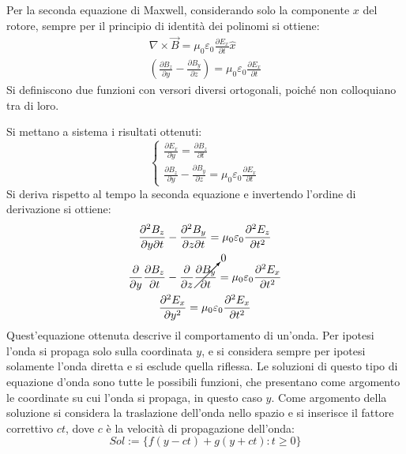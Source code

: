 \documentclass{article}
\numberwithin{equation}{subsection}
\begin{document}
Per la seconda equazione di Maxwell, considerando solo la componente $x$ del rotore, sempre per il principio di identità dei polinomi si ottiene:
\begin{gather*}
    \nabla\times\vec{B}=\mu_0\varepsilon_0\displaystyle\frac{\partial E_x}{\partial t}\hat{x}\\
    \left(\displaystyle\frac{\partial B_z}{\partial y}-\frac{\partial B_y}{\partial z}\right)=\mu_0\varepsilon_0\frac{\partial E_x}{\partial t}
\end{gather*}
Si definiscono due funzioni con versori diversi ortogonali, poiché non colloquiano tra di loro. 

Si mettano a sistema i risultati ottenuti:
\begin{equation*}
    \begin{cases}
        \displaystyle\frac{\partial E_x}{\partial y}=\frac{\partial B_z}{\partial t}\\
        \displaystyle\frac{\partial B_z}{\partial y}-\frac{\partial B_y}{\partial z}=\mu_0\varepsilon_0\frac{\partial E_x}{\partial t}
    \end{cases}
\end{equation*}
Si deriva rispetto al tempo la seconda equazione e invertendo l'ordine di derivazione si ottiene:
\begin{gather*}
    \displaystyle\frac{\partial^2B_z}{\partial y\partial t}-\frac{\partial^2B_y}{\partial z\partial t}=\mu_0\varepsilon_0\frac{\partial^2E_z}{\partial t^2}\\
    \displaystyle\frac{\partial}{\partial y}\frac{\partial B_z}{\partial t}-\frac{\partial}{\partial z}\cancelto{0}{\frac{\partial B_y}{\partial t}}=\mu_0\varepsilon_0\frac{\partial^2E_x}{\partial t^2}\\
    \displaystyle\frac{\partial^2E_x}{\partial y^2}=\mu_0\varepsilon_0\frac{\partial^2E_x}{\partial t^2}
\end{gather*}
Quest'equazione ottenuta descrive il comportamento di un'onda. Per ipotesi l'onda si propaga solo sulla coordinata $y$, e si considera sempre per ipotesi solamente l'onda 
diretta e si esclude quella riflessa. Le soluzioni di questo tipo di equazione d'onda sono tutte le possibili funzioni, che presentano come argomento le coordinate su cui 
l'onda si propaga, in questo caso $y$. Come argomento della soluzione si considera la traslazione dell'onda nello spazio e si inserisce il fattore correttivo $ct$, dove 
$c$ è la velocità di propagazione dell'onda:
\begin{equation*}
    Sol:=\{f(y-ct)+g(y+ct):t\geq0\}
\end{equation*}  
\end{document}
